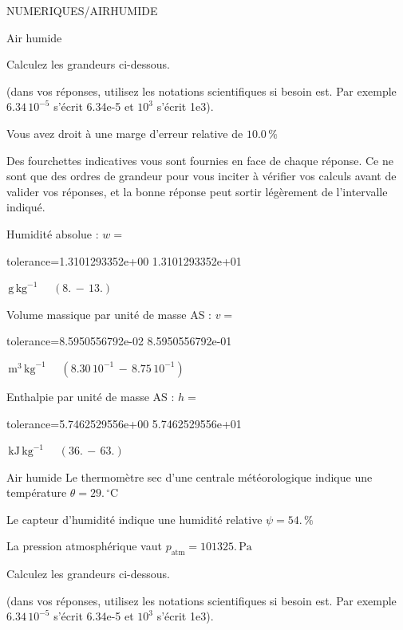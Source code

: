 \documentclass[12pt]{article}
\begin{document}
\begin{quiz}{NUMERIQUES/AIRHUMIDE}
\begin{cloze}{Air humide}
 

Calculez les grandeurs ci-dessous.

(dans vos réponses, utilisez les notations scientifiques si besoin est. Par exemple $6.34\, 10^{-5}$ s'écrit 6.34e-5 et $10^{3}$ s'écrit 1e3).

Vous avez droit à une marge d'erreur relative de $10.0\, \% $

Des fourchettes indicatives vous sont fournies en face de chaque réponse. Ce ne sont que des ordres de grandeur pour vous inciter à vérifier vos calculs avant de valider vos réponses, et la bonne réponse peut sortir légèrement de l'intervalle indiqué.

Humidité absolue : $w =  $
\begin{numerical}[points=1] 
\item[tolerance={1.3101293352e+00}] 1.3101293352e+01 
\end{numerical} 
 $\,  \mathrm{g}\,  \mathrm{kg}^{-1}$ 
 $ \quad (8. \, - \, 13.) $ 

Volume massique par unité de masse AS : $v =  $
\begin{numerical}[points=1] 
\item[tolerance={8.5950556792e-02}] 8.5950556792e-01 
\end{numerical} 
 $\,  \mathrm{m}^{3}\,  \mathrm{kg}^{-1}$ 
 $ \quad ( 8.30 \, 10^{-1}  \, - \,  8.75 \, 10^{-1} ) $ 

Enthalpie par unité de masse AS : $h =  $
\begin{numerical}[points=2] 
\item[tolerance={5.7462529556e+00}] 5.7462529556e+01 
\end{numerical} 
 $\,  \mathrm{kJ}\,  \mathrm{kg}^{-1}$ 
 $ \quad (36. \, - \, 63.) $ 

\end{cloze} 


 \begin{cloze}{Air humide} 
Le thermomètre sec d’une centrale météorologique indique une température $\theta = 29.\,  \mathrm{^\circ\mathrm{C}} $

Le capteur d'humidité indique une humidité relative $\psi = 54.\, \% $

La pression atmosphérique vaut $p_{\text{atm}} = 101325.\,  \mathrm{Pa} $

 

Calculez les grandeurs ci-dessous.

(dans vos réponses, utilisez les notations scientifiques si besoin est. Par exemple $6.34\, 10^{-5}$ s'écrit 6.34e-5 et $10^{3}$ s'écrit 1e3).


\end{cloze}
\end{quiz}
\end{document}
